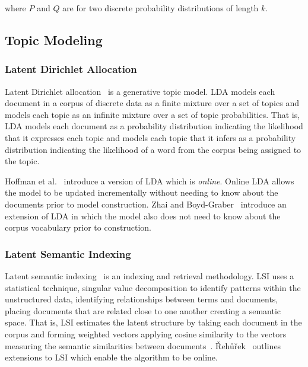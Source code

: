 where $P$ and $Q$ are for two discrete probability distributions of length $k$.

\subsection{Topic Modeling}

\subsubsection{Latent Dirichlet Allocation}

Latent Dirichlet allocation~\cite{Blei-etal:2003} is a generative topic model.
LDA models each document in a corpus of discrete data as a finite mixture over
a set of topics and models each topic as an infinite mixture over a set of
topic probabilities.  That is, LDA models each document as a probability
distribution indicating the likelihood that it expresses each topic and models
each topic that it infers as a probability distribution indicating the
likelihood of a word from the corpus being assigned to the topic.

Hoffman et al.~\cite{Hoffman-etal:2010} introduce a version of LDA which is 
\emph{online}.
Online LDA allows the model to be updated incrementally without needing
to know about the documents prior to model construction.
Zhai and Boyd-Graber~\cite{Zhai-Boyd-Graber:2013} introduce an extension of LDA 
in which the model also does not need to know about the corpus vocabulary prior to construction.

\subsubsection{Latent Semantic Indexing}

Latent semantic indexing~\cite{Deerwester-etal:1990} is an indexing and
retrieval methodology. LSI uses a statistical technique, singular value
decomposition to identify patterns within the unstructured data, identifying
relationships between terms and documents, placing documents that are related
close to one another creating a semantic space. That is, LSI estimates the
latent structure by taking each document in the corpus and forming weighted
vectors applying cosine similarity to the vectors measuring the semantic
similarities between documents~\cite{Binkley-Lawrie:2010}.
{\v R}eh{\r u}{\v r}ek~\cite{Radim:2011} outlines extensions to LSI 
which enable the algorithm to be online.


